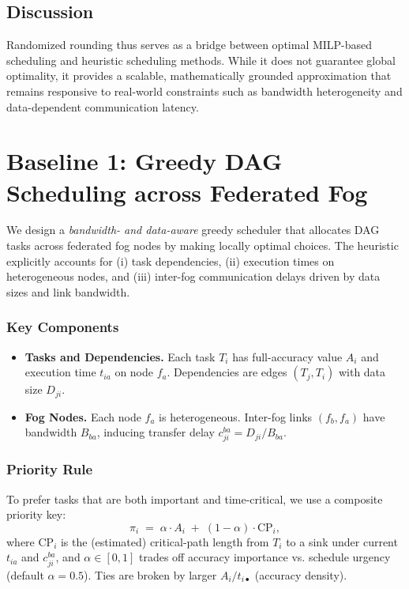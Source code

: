 \documentclass[conference]{IEEEtran}
\begin{document}
\subsection{Discussion}

Randomized rounding thus serves as a bridge between optimal MILP-based scheduling and heuristic scheduling methods. While it does not guarantee global optimality, it provides a scalable, mathematically grounded approximation that remains responsive to real-world constraints such as bandwidth heterogeneity and data-dependent communication latency.

\section{Baseline 1: Greedy DAG Scheduling across Federated Fog}
\label{sec:baseline-greedy}

We design a \emph{bandwidth- and data-aware} greedy scheduler that allocates DAG tasks across federated fog nodes by making locally optimal choices. The heuristic explicitly accounts for (i) task dependencies, (ii) execution times on heterogeneous nodes, and (iii) inter-fog communication delays driven by data sizes and link bandwidth.

\subsubsection{Key Components}
\begin{itemize}
    \item \textbf{Tasks and Dependencies.} Each task \(T_i\) has full-accuracy value \(A_i\) and execution time \(t_{ia}\) on node \(f_a\). Dependencies are edges \((T_j,T_i)\) with data size \(D_{ji}\).
    \item \textbf{Fog Nodes.} Each node \(f_a\) is heterogeneous. Inter-fog links \((f_b,f_a)\) have bandwidth \(B_{ba}\), inducing transfer delay \(c_{ji}^{ba}=D_{ji}/B_{ba}\).
\end{itemize}

\subsubsection{Priority Rule}
To prefer tasks that are both important and time-critical, we use a composite priority key:
\[
\pi_i \;=\; \alpha \cdot A_i \;+\; (1-\alpha)\cdot \text{CP}_i,
\]
where \(\text{CP}_i\) is the (estimated) critical-path length from \(T_i\) to a sink under current \(t_{ia}\) and \(c_{ji}^{ba}\), and \(\alpha\in[0,1]\) trades off accuracy importance vs. schedule urgency (default \(\alpha=0.5\)). Ties are broken by larger \(A_i/t_{i\bullet}\) (accuracy density).
\end{document}

